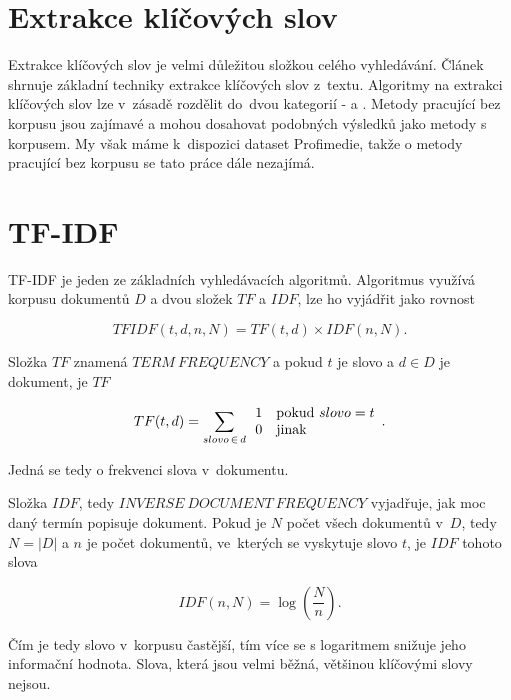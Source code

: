 \section{Extrakce klíčových slov}

Extrakce klíčových slov je velmi důležitou složkou celého vyhledávání. Článek \cite{lott} shrnuje základní techniky extrakce klíčových slov z~textu. Algoritmy na extrakci klíčových slov lze v~zásadě rozdělit do~dvou kategorií -  a . Metody pracující bez korpusu jsou zajímavé a mohou dosahovat podobných výsledků jako metody s korpusem. My však máme k~dispozici dataset Profimedie, takže o metody pracující bez korpusu se tato práce dále nezajímá. 

\section{TF-IDF}

TF-IDF\cite{tfidf} je jeden ze základních vyhledávacích algoritmů\cite{manning}. Algoritmus využívá korpusu dokumentů $D$ a dvou složek $TF$ a $IDF$, lze ho vyjádřit jako rovnost

\begin{equation}
  TFIDF(t,d,n,N)= TF(t,d)\times IDF(n,N).
\end{equation}

Složka $TF$ znamená $TERM\ FREQUENCY$ a pokud $t$ je slovo a $d \in D$ je dokument, je $TF$

\begin{equation}
 TF(t,d) = \sum_{slovo\,\in\,d} \begin{array}{l l} 1 & \mathrm{pokud}\ slovo = t \\
  0 & \mathrm{jinak} \end{array}.
\end{equation}

Jedná se tedy o frekvenci slova v~dokumentu.

Složka $IDF$, tedy $INVERSE\ DOCUMENT\ FREQUENCY$ vyjadřuje, jak moc daný termín popisuje dokument. Pokud je $N$ počet všech dokumentů v~$D$, tedy $N = |D|$ a $n$ je počet dokumentů, ve~kterých se vyskytuje slovo $t$, je $IDF$ tohoto slova

\begin{equation}
IDF(n,N) = \log \left(\frac{N}{n}\right).
\end{equation}

Čím je tedy slovo v~korpusu častější, tím více se s logaritmem snižuje jeho informační hodnota. Slova, která jsou velmi běžná, většinou klíčovými slovy nejsou.

